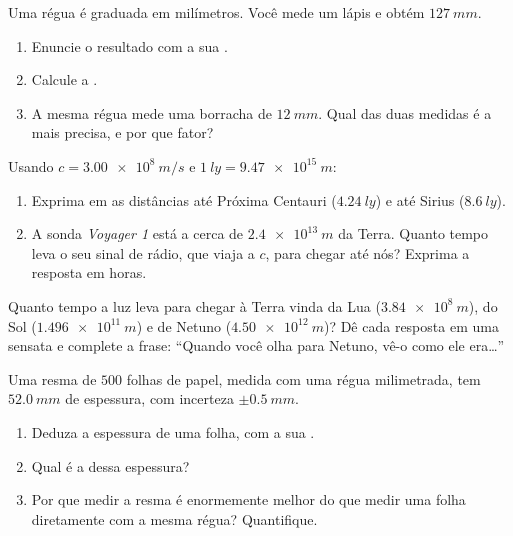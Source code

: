 \begin{exercise}[$\star$]\label{exo:g10:orders-of-magnitude:5}
Uma régua é graduada em milímetros. Você mede um lápis e obtém
$\qty{127}{mm}$.
\begin{enumerate}
  \item Enuncie o resultado com a sua .
  \item Calcule a .
  \item A mesma régua mede uma borracha de $\qty{12}{mm}$. Qual das duas
        medidas é a mais precisa, e por que fator?
\end{enumerate}
\end{exercise}

\begin{exercise}[$\star\star$]\label{exo:g10:orders-of-magnitude:6}
Usando $c = \qty{3.00e8}{m/s}$ e $\qty{1}{ly} = \qty{9.47e15}{m}$:
\begin{enumerate}
  \item Exprima em  as distâncias até Próxima Centauri
        ($\qty{4.24}{ly}$) e até Sirius ($\qty{8.6}{ly}$).
  \item A sonda \emph{Voyager 1} está a cerca de $\qty{2.4e13}{m}$ da
        Terra. Quanto tempo leva o seu sinal de rádio, que viaja a $c$,
        para chegar até nós? Exprima a resposta em horas.
\end{enumerate}
\end{exercise}

\begin{exercise}[$\star\star$]\label{exo:g10:orders-of-magnitude:7}
Quanto tempo a luz leva para chegar à Terra vinda da Lua
($\qty{3.84e8}{m}$), do Sol ($\qty{1.496e11}{m}$) e de Netuno
($\qty{4.50e12}{m}$)? Dê cada resposta em uma  sensata e complete
a frase: ``Quando você olha para Netuno, vê-o como ele era\dots''
\end{exercise}

\begin{exercise}[$\star\star$]\label{exo:g10:orders-of-magnitude:8}
Uma resma de $500$ folhas de papel, medida com uma régua milimetrada,
tem $\qty{52.0}{mm}$ de espessura, com incerteza $\pm\qty{0.5}{mm}$.
\begin{enumerate}
  \item Deduza a espessura de uma folha, com a sua .
  \item Qual é a  dessa espessura?
  \item Por que medir a resma é enormemente melhor do que medir uma
        folha diretamente com a mesma régua? Quantifique.
\end{enumerate}
\end{exercise}

